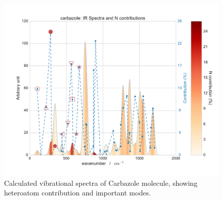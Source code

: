 	 
	\begin{figure}[H]
		\begin{center}
			\includegraphics[scale=0.6]{image/P2-6}
		\end{center}
		\caption{Calculated vibrational spectra of Carbazole molecule, showing heteroatom contribution and important modes.}  \label{figP2-6}
	\end{figure}
	

	
	
